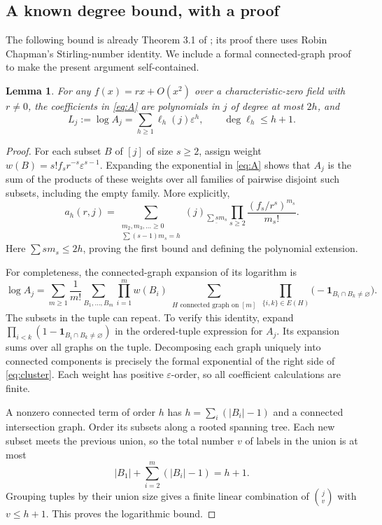 \documentclass[11pt]{article}
\newtheorem{lemma}[theorem]{Lemma}
\newcommand{\ff}[2]{(#1)_{\underline{#2}}}
\newcommand{\eps}{\varepsilon}
\begin{document}
\subsection*{A known degree bound, with a proof}
The following bound is already Theorem 3.1 of \cite{fed}; its proof
there uses Robin Chapman's Stirling-number identity. We include a
formal connected-graph proof to make the present argument self-contained.

\begin{lemma}\label{lem:degree}
For any $f(x)=rx+O(x^2)$ over a characteristic-zero field with $r\ne0$,
the coefficients in \eqref{eq:A} are polynomials in $j$ of degree at
most $2h$, and
\[
 L_j:=\log A_j=\sum_{h\ge1}\ell_h(j)\eps^h,
 \qquad \deg\ell_h\le h+1.
\]
\end{lemma}
\begin{proof}
For each subset $B$ of $[j]$ of size $s\ge2$, assign weight
$w(B)=s!f_s r^{-s}\eps^{s-1}$. Expanding the exponential in
\eqref{eq:A} shows that $A_j$ is the sum of the products of these
weights over all families of pairwise disjoint such subsets, including
the empty family. More explicitly,
\begin{equation}\label{eq:polynomial}
 a_h(r,j)=
 \sum_{\substack{m_2,m_3,\ldots\ge0\\\sum(s-1)m_s=h}}
 \ff{j}{\sum s m_s}\prod_{s\ge2}\frac{(f_s/r^s)^{m_s}}{m_s!}.
\end{equation}
Here $\sum sm_s\le2h$, proving the first bound and defining the
polynomial extension.

For completeness, the connected-graph expansion of its logarithm is
\begin{equation}\label{eq:cluster}
 \log A_j=\sum_{m\ge1}\frac1{m!}
 \sum_{B_1,\ldots,B_m}\prod_{i=1}^m w(B_i)
 \sum_{\substack{H\text{ connected graph on }[m]}}
 \prod_{\{i,k\}\in E(H)}
       \bigl(-\mathbf1_{B_i\cap B_k\ne\varnothing}\bigr).
\end{equation}
The subsets in the tuple can repeat. To verify this identity, expand
$\prod_{i<k}(1-\mathbf1_{B_i\cap B_k\ne\varnothing})$ in the
ordered-tuple expression for $A_j$. Its expansion sums over all graphs
on the tuple. Decomposing each graph uniquely into connected components
is precisely the formal exponential of the right side of
\eqref{eq:cluster}. Each weight has positive $\eps$-order, so all
coefficient calculations are finite.

A nonzero connected term of order $h$ has
$h=\sum_i(|B_i|-1)$ and a connected intersection graph. Order its
subsets along a rooted spanning tree. Each new subset meets the
previous union, so the total number $v$ of labels in the union is at
most
\[
 |B_1|+\sum_{i=2}^m(|B_i|-1)=h+1.
\]
Grouping tuples by their union size gives a finite linear combination
of $\binom jv$ with $v\le h+1$. This proves the logarithmic bound.
\end{proof}
\end{document}

